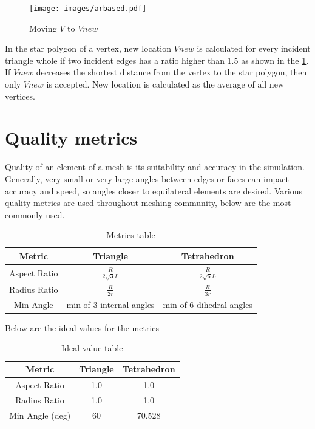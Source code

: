 \begin{figure}[h]
	\centering
	\texttt{[image: images/arbased.pdf]}
	\caption{Moving $V$ to $Vnew$}
	\label{fig:arbased}
\end{figure}

In the star polygon of a vertex, new location $Vnew$ is calculated for every incident triangle whole if two incident edges has a ratio higher than 1.5 as shown in the \ref{fig:arbased}. If $Vnew$ decreases the shortest distance from the vertex to the star polygon, then only $Vnew$ is accepted. New location is calculated as the average of all new vertices.

\section{Quality metrics}
Quality of an element of a mesh is its suitability and accuracy in the simulation. Generally, very small or very large angles between edges or faces can impact accuracy and speed, so angles closer to equilateral elements are desired. Various quality metrics are used throughout meshing community, below are the most commonly used.

\begin{table}[ht]
\caption{Metrics table}
\begin{center}
\begin{tabular}{ |c|c|c| } 
\hline
Metric & Triangle & Tetrahedron \\ 
\hline
Aspect Ratio & $\frac{R}{2\sqrt{3}L}$ & $\frac{R}{2\sqrt{6}L}$ \\ 
\hline
Radius Ratio & $\frac{R}{2r}$ & $\frac{R}{3r}$ \\ 
\hline
Min Angle 	 & min of 3 internal angles & min of 6 dihedral angles  \\ 
\hline
\end{tabular}
\end{center}
\end{table}

Below are the ideal values for the metrics

\begin{table}[ht]
\caption{Ideal value table}
\begin{center}
\begin{tabular}{ |c|c|c| } 
\hline
Metric & Triangle & Tetrahedron \\ 
\hline
Aspect Ratio & 1.0 & 1.0 \\ 
\hline
Radius Ratio & 1.0 & 1.0 \\ 
\hline
Min Angle (deg)	& 60 & 70.528  \\ 
\hline
\end{tabular}
\end{center}
\end{table}

